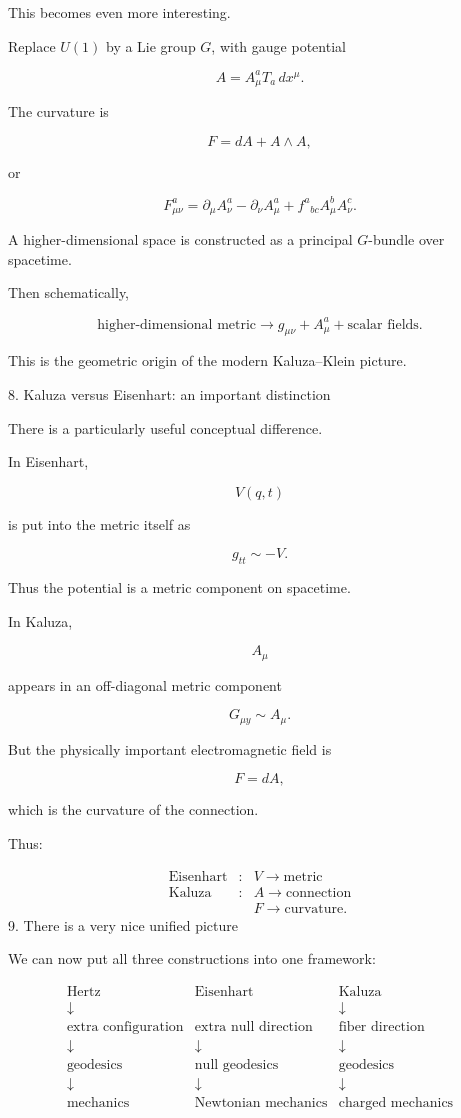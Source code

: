 This becomes even more interesting.

Replace \(U(1)\) by a Lie group \(G\), with gauge potential

$$ A=A_\mu^a T_a\,dx^\mu. $$

The curvature is

$$ F=dA+A\wedge A, $$

or

$$ F_{\mu\nu}^a = \partial_\mu A_\nu^a -\partial_\nu A_\mu^a + f^a{}_{bc}A_\mu^bA_\nu^c. $$

A higher-dimensional space is constructed as a principal \(G\)-bundle over spacetime.

Then schematically,

$$ \boxed{ \text{higher-dimensional metric} \longrightarrow g_{\mu\nu}+A_\mu^a+\text{scalar fields}. } $$

This is the geometric origin of the modern Kaluza–Klein picture.

8. Kaluza versus Eisenhart: an important distinction

There is a particularly useful conceptual difference.

In Eisenhart,

$$ V(q,t) $$

is put into the metric itself as

$$ g_{tt}\sim -V. $$

Thus the potential is a metric component on spacetime.

In Kaluza,

$$ A_\mu $$

appears in an off-diagonal metric component

$$ G_{\mu y}\sim A_\mu. $$

But the physically important electromagnetic field is

$$ F=dA, $$

which is the curvature of the connection.

Thus:

$$ \boxed{ \begin{array}{rcl} \text{Eisenhart} &: & V\rightarrow\text{metric}\\ \text{Kaluza} &: & A\rightarrow\text{connection}\\ &&F\rightarrow\text{curvature}. \end{array}} $$
9. There is a very nice unified picture

We can now put all three constructions into one framework:

$$ \boxed{ \begin{array}{ccc} \text{Hertz} & \text{Eisenhart} & \text{Kaluza} \\[3pt] \downarrow&&\downarrow \\[-2pt] \text{extra configuration} & \text{extra null direction} & \text{fiber direction} \\ \downarrow& \downarrow& \downarrow \\ \text{geodesics} & \text{null geodesics} & \text{geodesics} \\ \downarrow& \downarrow& \downarrow \\ \text{mechanics} & \text{Newtonian mechanics} & \text{charged mechanics} \end{array}} $$

